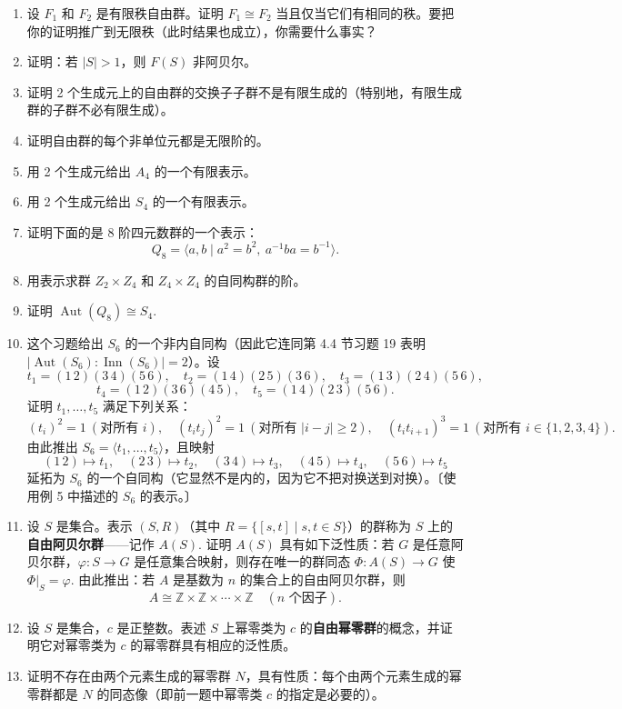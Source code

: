 \begin{enumerate}
\item 设 \(F_1\) 和 \(F_2\) 是有限秩自由群。证明 \(F_1 \cong F_2\) 当且仅当它们有相同的秩。要把你的证明推广到无限秩（此时结果也成立），你需要什么事实？

\item 证明：若 \(|S| > 1\)，则 \(F(S)\) 非阿贝尔。

\item 证明 2 个生成元上的自由群的交换子子群不是有限生成的（特别地，有限生成群的子群不必有限生成）。

\item 证明自由群的每个非单位元都是无限阶的。

\item 用 2 个生成元给出 \(A_4\) 的一个有限表示。

\item 用 2 个生成元给出 \(S_4\) 的一个有限表示。

\item 证明下面的是 8 阶四元数群的一个表示：
\[
Q_8 = \langle a, b \mid a^2 = b^2,\ a^{-1}ba = b^{-1} \rangle.
\]

\item 用表示求群 \(Z_2 \times Z_4\) 和 \(Z_4 \times Z_4\) 的自同构群的阶。

\item 证明 \(\operatorname{Aut}(Q_8) \cong S_4\).

\item 这个习题给出 \(S_6\) 的一个非内自同构（因此它连同第 4.4 节习题 19 表明 \(|\operatorname{Aut}(S_6) : \operatorname{Inn}(S_6)| = 2\)）。设
\[
t_1 = (1\,2)(3\,4)(5\,6),\quad t_2 = (1\,4)(2\,5)(3\,6),\quad t_3 = (1\,3)(2\,4)(5\,6),
\]
\[
t_4 = (1\,2)(3\,6)(4\,5),\quad t_5 = (1\,4)(2\,3)(5\,6).
\]
证明 \(t_1, \ldots, t_5\) 满足下列关系：
\[
(t_i)^2 = 1\ (\text{对所有 } i), \quad (t_it_j)^2 = 1\ (\text{对所有 } |i-j| \geq 2), \quad (t_it_{i+1})^3 = 1\ (\text{对所有 } i \in \{1,2,3,4\}).
\]
由此推出 \(S_6 = \langle t_1, \ldots, t_5 \rangle\)，且映射
\[
(1\,2) \mapsto t_1,\quad (2\,3) \mapsto t_2,\quad (3\,4) \mapsto t_3,\quad (4\,5) \mapsto t_4,\quad (5\,6) \mapsto t_5
\]
延拓为 \(S_6\) 的一个自同构（它显然不是内的，因为它不把对换送到对换）。〔使用例 5 中描述的 \(S_6\) 的表示。〕

\item 设 \(S\) 是集合。表示 \((S, R)\)（其中 \(R = \{[s, t] \mid s, t \in S\}\)）的群称为 \(S\) 上的\textbf{自由阿贝尔群}——记作 \(A(S)\). 证明 \(A(S)\) 具有如下泛性质：若 \(G\) 是任意阿贝尔群，\(\varphi : S \to G\) 是任意集合映射，则存在唯一的群同态 \(\Phi : A(S) \to G\) 使 \(\Phi|_S = \varphi\). 由此推出：若 \(A\) 是基数为 \(n\) 的集合上的自由阿贝尔群，则
\[
A \cong \mathbb{Z} \times \mathbb{Z} \times \cdots \times \mathbb{Z} \quad (n \text{ 个因子}).
\]

\item 设 \(S\) 是集合，\(c\) 是正整数。表述 \(S\) 上幂零类为 \(c\) 的\textbf{自由幂零群}的概念，并证明它对幂零类为 \(c\) 的幂零群具有相应的泛性质。

\item 证明不存在由两个元素生成的幂零群 \(N\)，具有性质：每个由两个元素生成的幂零群都是 \(N\) 的同态像（即前一题中幂零类 \(c\) 的指定是必要的）。
\end{enumerate}
